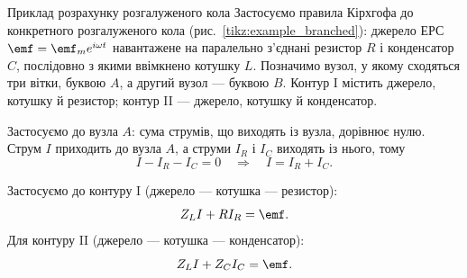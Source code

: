 \begin{Example}{Приклад розрахунку розгалуженого кола}
Застосуємо правила Кірхгофа до конкретного розгалуженого кола (рис.~\ref{tikz:example_branched}): джерело ЕРС $\emf = \emf_m e^{i\omega t}$ навантажене на паралельно з'єднані резистор $R$ і конденсатор $C$, послідовно з якими ввімкнено котушку $L$. Позначимо вузол, у якому сходяться три вітки, буквою $A$, а другий вузол --- буквою $B$. Контур I містить джерело, котушку й резистор; контур II --- джерело, котушку й конденсатор.

\begin{center}%
	\centering
	\label{tikz:example_branched}
\end{center}

Застосуємо  до вузла $A$: сума струмів, що виходять із вузла, дорівнює нулю. Струм $I$ приходить до вузла $A$, а струми $I_R$ і $I_C$ виходять із нього, тому
\begin{equation}\label{eq:example_KCL}
	I - I_R - I_C = 0
	\quad\Rightarrow\quad
	I = I_R + I_C.
\end{equation}

Застосуємо  до контуру I (джерело --- котушка --- резистор):
\begin{equation}\label{eq:example_KVL_I}
	Z_L I + R I_R = \emf.
\end{equation}
Для контуру II (джерело --- котушка --- конденсатор):
\begin{equation}\label{eq:example_KVL_II}
	Z_L I + Z_C I_C = \emf.
\end{equation}


\end{Example}
